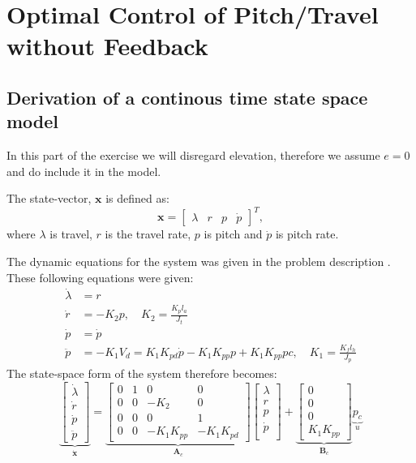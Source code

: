 \documentclass[../main.tex]{subfiles}
\begin{document}
\section{Optimal Control of Pitch/Travel without Feedback}\label{kap:Part2OptimalControlWithoutFeedback}

\subsection{Derivation of a continous time state space model}
In this part of the exercise we will disregard elevation, therefore we assume $ e = 0 $ and do include it in the model.

The state-vector, $\bm x$ is defined as:
\begin{equation}\label{eq:lab2_state}
	\bm x = 
	\begin{bmatrix}
		\lambda & r & p & \dot p
	\end{bmatrix}
	^T ,
\end{equation}
where $\lambda$ is travel, $r$ is the travel rate, $p$ is pitch and $\dot{p}$ is pitch rate.

The dynamic equations for the system was given in the problem description . These following equations were given:
\begin{subequations} \label{eq:lab2_states_eq}
	\begin{align}
		\dot \lambda &= r \\
		\dot r &= -K_2 p, \quad K_2 = \frac{K_p l_a}{J_t}\\
		\dot p &= \dot p \\
		\ddot p &= -K_1 V_d = K_1 K_{pd} \dot p - K_1 K_{pp} p + K_1 K_{pp} pc, \quad K_1 = \frac{K_f l_h}{J_p}
	\end{align}
\end{subequations}
The state-space form of the system therefore becomes: 
\begin{equation}\label{eq:lab2_cont_ss}
	\underbrace{\begin{bmatrix}
		\dot \lambda \\
		\dot r \\
		\dot p \\
		\ddot p
	\end{bmatrix}}_{\bm{\dot x}} = 
	\underbrace{
	\begin{bmatrix}
		0 & 1 & 0 & 0 \\
		0 & 0 & -K_2 & 0 \\
		0 & 0 & 0 & 1 \\
		0 & 0 & -K_1 K_{pp} &  -K_1 K_{pd}
	\end{bmatrix}
	}_{\bm A_c}
	\begin{bmatrix}
		\lambda \\ r \\ p \\ \dot{p} \\
	\end{bmatrix}
	+
	\underbrace{
		\begin{bmatrix}
			0 \\ 0 \\ 0 \\ K_1 K_{pp}
		\end{bmatrix}
	}_{\bm B_c} \underbrace{p_c}_{u}
\end{equation}
\end{document}
